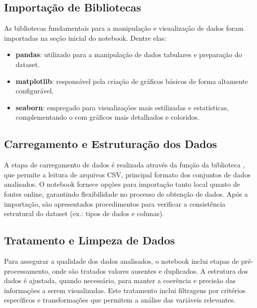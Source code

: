 \documentclass[12pt, openright, oneside, a4paper, chapter=TITLE, section=TITLE, subsection=TITLE, subsubsection=TITLE, brazil]{abntex2}
\begin{document}
\subsection{Importação de Bibliotecas}
\hspace{1.25cm}As bibliotecas fundamentais para a manipulação e visualização de dados foram importadas na seção inicial do notebook. Dentre elas:
\begin{itemize}
    \item \textbf{pandas}: utilizado para a manipulação de dados tabulares e preparação do dataset.
    \item \textbf{matplotlib}: responsável pela criação de gráficos básicos de forma altamente configurável.
    \item \textbf{seaborn}: empregado para visualizações mais estilizadas e estatísticas, complementando o  com gráficos mais detalhados e coloridos.
\end{itemize}

\subsection{Carregamento e Estruturação dos Dados}
\hspace{1.25cm}A etapa de carregamento de dados é realizada através da função  da biblioteca , que permite a leitura de arquivos CSV, principal formato dos conjuntos de dados analisados. O notebook fornece opções para importação tanto local quanto de fontes online, garantindo flexibilidade no processo de obtenção de dados. Após a importação, são apresentados procedimentos para verificar a consistência estrutural do dataset (ex.: tipos de dados e colunas).

\subsection{Tratamento e Limpeza de Dados}
\hspace{1.25cm}Para assegurar a qualidade dos dados analisados, o notebook inclui etapas de pré-processamento, onde são tratados valores ausentes e duplicados. A estrutura dos dados é ajustada, quando necessário, para manter a coerência e precisão das informações a serem visualizadas. Este tratamento inclui filtragens por critérios específicos e transformações que permitem a análise das variáveis relevantes.
\end{document}
